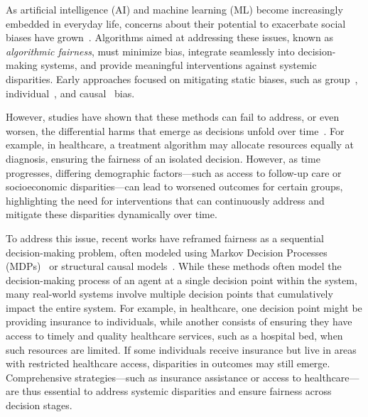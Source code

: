 \label{intro}

As artificial intelligence (AI) and machine learning (ML) become increasingly embedded in everyday life, concerns about their potential to exacerbate social biases have grown~\cite{sweeney2013discrimination, angwin2016machine, LarsonCompas, buolamwini2018gender}. 
Algorithms aimed at addressing these issues, known as \textit{algorithmic fairness}, must minimize bias, integrate seamlessly into decision-making systems, and provide meaningful interventions against systemic disparities. Early approaches focused on mitigating static biases, such as group~\cite{kamiran2012data, hardt2016equality}, individual~\cite{dwork2012fairness}, and causal~\cite{kusner2017counterfactual, coston2020counterfactual} bias. 

However, studies have shown that these methods can fail to address, or even worsen, the differential harms that emerge as decisions unfold over time~\cite{liu2018delayed, d2020fairness}. For example, in healthcare, a treatment algorithm may allocate resources equally at diagnosis, ensuring the fairness of an isolated decision. However, as time progresses, differing demographic factors---such as access to follow-up care or socioeconomic disparities—can lead to worsened outcomes for certain groups, highlighting the need for interventions that can continuously address and mitigate these disparities dynamically over time.

To address this issue, recent works have reframed fairness as a sequential decision-making problem, often modeled using Markov Decision Processes (MDPs)~\cite{yin2024long, xuadapting} or structural causal models~\cite{hu2022achieving}. While these methods often model the decision-making process of an agent at a single decision point within the system, many real-world systems involve multiple decision points that cumulatively impact the entire system. For example, in healthcare, one decision point might be providing insurance to individuals, while another consists of ensuring they have access to timely and quality healthcare services, such as a hospital bed, when such resources are limited. If some individuals receive insurance but live in areas with restricted healthcare access, disparities in outcomes may still emerge. Comprehensive strategies---such as insurance assistance or access to healthcare---are thus essential to address systemic disparities and ensure fairness across decision stages.

